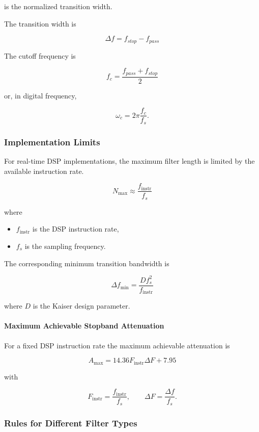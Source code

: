 is the normalized transition width.

The transition width is

\[
\boxed{
\Delta f
=
f_{stop}-f_{pass}
}
\]

The cutoff frequency is

\[
\boxed{
f_c
=
\frac{f_{pass}+f_{stop}}2
}
\]

or, in digital frequency,

\[
\boxed{
\omega_c
=
2\pi
\frac{f_c}{f_s}.
}
\]

\subsubsection{Implementation Limits}

For real-time DSP implementations, the maximum filter length is limited
by the available instruction rate.

\[
\boxed{
N_{\max}
\approx
\frac{f_{\mathrm{instr}}}{f_s}
}
\]

where

\begin{itemize}
\item $f_{\mathrm{instr}}$ is the DSP instruction rate,
\item $f_s$ is the sampling frequency.
\end{itemize}

The corresponding minimum transition bandwidth is

\[
\boxed{
\Delta f_{\min}
=
\frac
{Df_s^2}
{f_{\mathrm{instr}}}
}
\]

where $D$ is the Kaiser design parameter.

\paragraph{Maximum Achievable Stopband Attenuation}

For a fixed DSP instruction rate the maximum achievable attenuation is

\[
\boxed{
A_{\max}
=
14.36
F_{\mathrm{instr}}
\Delta F
+
7.95
}
\]

with

\[
F_{\mathrm{instr}}
=
\frac{f_{\mathrm{instr}}}{f_s},
\qquad
\Delta F
=
\frac{\Delta f}{f_s}.
\]

\subsubsection{Rules for Different Filter Types}

